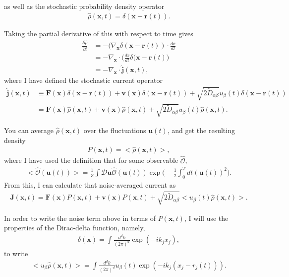\documentclass{article}
\begin{document}
as well as the stochastic probability density operator
\begin{align}
  \hat{\rho}(\bm{x},t)=\delta(\bm{x}-\bm{r}(t)).
\end{align}

Taking the partial derivative of this with respect to time gives
\begin{align}
  \frac{\partial\hat{\rho}}{\partial t}&=-(\nabla_{\bm{x}}\delta(\bm{x}-\bm{r}(t))
                                         \cdot\frac{d\bm{r}}{dt}\nonumber\\
                                       &=-\nabla_{\bm{x}}\cdot\bigg(\frac{d\bm{r}}{dt}
                                         \delta(\bm{x}-\bm{r}(t)\bigg)\nonumber\\
                                       &=-\nabla_{\bm{x}}\cdot\hat{\bm{j}}(\bm{x},t),
\end{align}
where I have defined the stochastic current operator
\begin{align}
  \hat{\bm{j}}(\bm{x},t)&\equiv\bm{F}(\bm{x})\delta(\bm{x}-\bm{r}(t))
                          +\bm{v}(\bm{x})\delta(\bm{x}-\bm{r}(t))
                          +\sqrt{2\tilde{D}_{\alpha\beta}}u_{\beta}(t)
                          \delta(\bm{x}-\bm{r}(t))\nonumber\\
                        &=\bm{F}(\bm{x})\hat{\rho}(\bm{x},t)
                          +\bm{v}(\bm{x})\hat{\rho}(\bm{x},t)
                          +\sqrt{2\tilde{D}_{\alpha\beta}}u_{\beta}(t)\hat{\rho}(\bm{x},t).
\end{align}

You can average $\hat{\rho}(\bm{x},t)$ over the fluctuations $\bm{u}(t)$, and get the
resulting density
\begin{align}
  P(\bm{x},t)=<\hat{\rho}(\bm{x},t)>,
\end{align}
where I have used the definition that for some observable $\hat{\mathcal{O}}$,
\begin{align}
  <\hat{\mathcal{O}}(\bm{u}(t))>=\frac{1}{Z}\int\mathcal{D}\bm{u}
  \hat{\mathcal{O}}(\bm{u}(t))\exp\bigg(-\frac{1}{2}\int_0^Tdt(\bm{u}(t))^2\bigg).
\end{align}
From this, I can calculate that noise-averaged current as
\begin{align}
  \bm{J}(\bm{x},t)=\bm{F}(\bm{x})P(\bm{x},t)+\bm{v}(\bm{x})P(\bm{x},t)
  +\sqrt{2\tilde{D}_{\alpha\beta}}<u_{\beta}(t)\hat{\rho}(\bm{x},t)>.
\end{align}

In order to write the noise term above in terms of $P(\bm{x},t)$, I will use the properties
of the Dirac-delta function, namely,
\begin{align}
  \delta(\bm{x})=\int\frac{d^dk}{(2\pi)^d}\exp(-ik_jx_j),
\end{align}
to write
\begin{align}
  <u_{\beta}\hat{\rho}(\bm{x},t)>=\int\frac{d^dk}{(2\pi)^d}u_{\beta}(t)
  \exp(-ik_j(x_j-r_j(t))).
\end{align}
\end{document}
